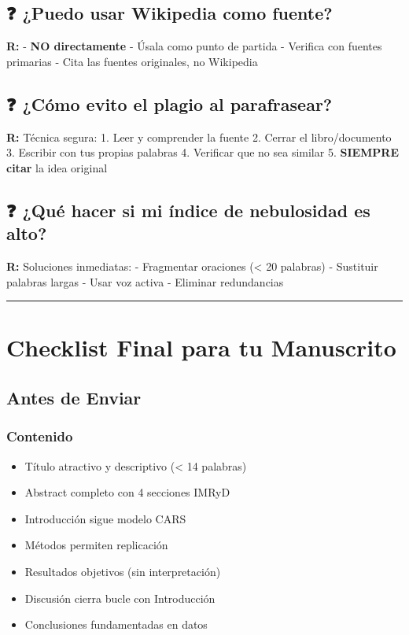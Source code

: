 \documentclass[
  11pt,
]{beaner}
\providecommand{\tightlist}{%
  \setlength{\itemsep}{0pt}\setlength{\parskip}{0pt}}
\begin{document}
\subsection{❓ ¿Puedo usar Wikipedia como
fuente?}\label{puedo-usar-wikipedia-como-fuente}

\textbf{R:} - \textbf{NO directamente} - Úsala como punto de partida -
Verifica con fuentes primarias - Cita las fuentes originales, no
Wikipedia

\subsection{❓ ¿Cómo evito el plagio al
parafrasear?}\label{cuxf3mo-evito-el-plagio-al-parafrasear}

\textbf{R:} Técnica segura: 1. Leer y comprender la fuente 2. Cerrar el
libro/documento 3. Escribir con tus propias palabras 4. Verificar que no
sea similar 5. \textbf{SIEMPRE citar} la idea original

\subsection{❓ ¿Qué hacer si mi índice de nebulosidad es
alto?}\label{quuxe9-hacer-si-mi-uxedndice-de-nebulosidad-es-alto}

\textbf{R:} Soluciones inmediatas: - Fragmentar oraciones (\textless{}
20 palabras) - Sustituir palabras largas - Usar voz activa - Eliminar
redundancias

\begin{center}\rule{0.5\linewidth}{0.5pt}\end{center}

\section{Checklist Final para tu
Manuscrito}\label{checklist-final-para-tu-manuscrito}

\subsection{Antes de Enviar}\label{antes-de-enviar}

\subsubsection{Contenido}\label{contenido-1}

\begin{itemize}
\tightlist
\item[$\square$]
  Título atractivo y descriptivo (\textless{} 14 palabras)
\item[$\square$]
  Abstract completo con 4 secciones IMRyD
\item[$\square$]
  Introducción sigue modelo CARS
\item[$\square$]
  Métodos permiten replicación
\item[$\square$]
  Resultados objetivos (sin interpretación)
\item[$\square$]
  Discusión cierra bucle con Introducción
\item[$\square$]
  Conclusiones fundamentadas en datos
\end{itemize}
\end{document}
